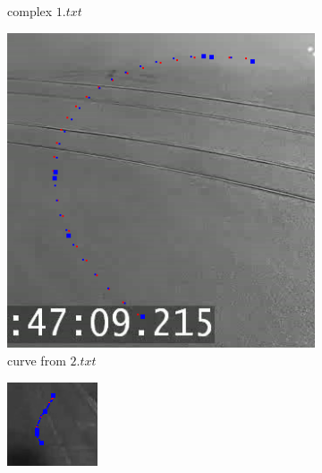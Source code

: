 \begin{figure}[!htb]
\begin{subfigure}[!htb]{0.3\textwidth}
		\caption{complex $1.txt$}
	\end{subfigure}
	\hfill
	\begin{subfigure}[!htb]{0.3\textwidth}
		\centering{}
		\includegraphics[width=\textwidth]{images/regr_kp_curve_2.png}
		\caption{curve from $2.txt$}
	\end{subfigure}
	\hfill
	\begin{subfigure}[!htb]{0.3\textwidth}
		\centering{}
		\includegraphics[width=\textwidth]{images/regr_kp_complex_3.png}

\end{subfigure}
\end{figure}
